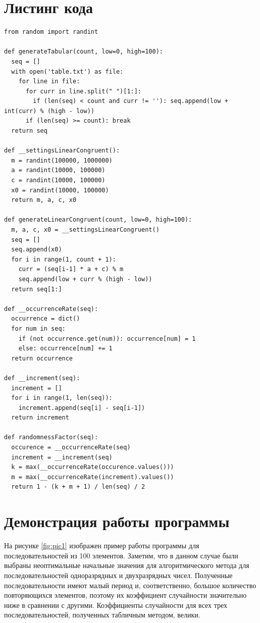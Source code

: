 \documentclass[12pt]{report}
\begin{document}
\section*{Листинг кода}
\begin{lstlisting}
from random import randint

def generateTabular(count, low=0, high=100):
  seq = []
  with open('table.txt') as file:
    for line in file:
      for curr in line.split(" ")[1:]:
        if (len(seq) < count and curr != ''): seq.append(low + int(curr) % (high - low))
      if (len(seq) >= count): break
  return seq

def __settingsLinearCongruent():
  m = randint(100000, 1000000)
  a = randint(10000, 100000)
  c = randint(10000, 100000)
  x0 = randint(10000, 100000)
  return m, a, c, x0

def generateLinearCongruent(count, low=0, high=100):
  m, a, c, x0 = __settingsLinearCongruent()
  seq = []
  seq.append(x0)
  for i in range(1, count + 1):
    curr = (seq[i-1] * a + c) % m
    seq.append(low + curr % (high - low))
  return seq[1:]
  
def __occurrenceRate(seq):
  occurrence = dict()
  for num in seq:
    if (not occurrence.get(num)): occurrence[num] = 1
    else: occurrence[num] += 1
  return occurrence

def __increment(seq):
  increment = []
  for i in range(1, len(seq)):
    increment.append(seq[i] - seq[i-1])
  return increment

def randomnessFactor(seq):
  occurence = __occurrenceRate(seq)
  increment = __increment(seq)
  k = max(__occurrenceRate(occurence.values()))
  m = max(__occurrenceRate(increment).values())
  return 1 - (k + m + 1) / len(seq) / 2
\end{lstlisting}

\section*{Демонстрация работы программы}
На рисунке \ref{fig:pic1} изображен пример работы программы для последовательностей из 100 элементов.
Заметим, что в данном случае были выбраны неоптимальные начальные значения для алгоритмического метода для последовательностей одноразрядных и двухразрядных чисел. Полученные последовательности имеют малый период и, соответственно, большое количество повторяющихся элементов, поэтому их коэффициент случайности значительно ниже в сравнении с другими. 
Коэффициенты случайности для всех трех последовательностей, полученных табличным методом, велики.
\end{document}
